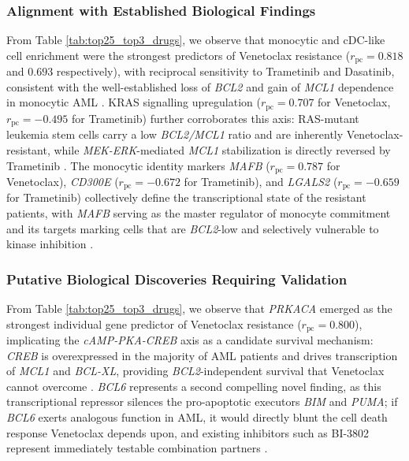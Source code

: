 \documentclass[sigconf,authordraft]{acmart}
\begin{document}
\subsubsection{Alignment with Established Biological Findings}
From Table \ref{tab:top25_top3_drugs}, we observe that monocytic and cDC-like cell enrichment were the strongest predictors of Venetoclax resistance ($r_{\text{pc}}=0.818$ and $0.693$ respectively), with reciprocal sensitivity to Trametinib and Dasatinib, consistent with the well-established loss of \textit{BCL2} and gain of \textit{MCL1} dependence in monocytic AML \cite{pei2020monocytic,lachowiez2025genetic}. KRAS signalling upregulation ($r_{\text{pc}}=0.707$ for Venetoclax, $r_{\text{pc}}=-0.495$ for Trametinib) further corroborates this axis: RAS-mutant leukemia stem cells carry a low \textit{BCL2/MCL1} ratio and are inherently Venetoclax-resistant, while \textit{MEK-ERK}-mediated \textit{MCL1} stabilization is directly reversed by Trametinib \cite{sango2024ras, desikan2022phase}. The monocytic identity markers \textit{MAFB} ($r_{\text{pc}}=0.787$ for Venetoclax), \textit{CD300E} ($r_{\text{pc}}=-0.672$ for Trametinib), and \textit{LGALS2} ($r_{\text{pc}}=-0.659$ for Trametinib) collectively define the transcriptional state of the resistant patients, with \textit{MAFB} serving as the master regulator of monocyte commitment and its targets marking cells that are \textit{BCL2}-low and selectively vulnerable to kinase inhibition \cite{pei2020monocytic,kelly2000mafb}.
\vspace{-2mm}
\subsubsection{Putative Biological Discoveries Requiring Validation}
From Table \ref{tab:top25_top3_drugs}, we observe that \textit{PRKACA} emerged as the strongest individual gene predictor of Venetoclax resistance ($r_{\text{pc}}=0.800$), implicating the \textit{cAMP-PKA-CREB} axis as a candidate survival mechanism: \textit{CREB} is overexpressed in the majority of AML patients and drives transcription of \textit{MCL1} and \textit{BCL-XL}, providing \textit{BCL2}-independent survival that Venetoclax cannot overcome \cite{shankar2005role}. \textit{BCL6} represents a second compelling novel finding, as this transcriptional repressor silences the pro-apoptotic executors \textit{BIM} and \textit{PUMA}; if \textit{BCL6} exerts analogous function in AML, it would directly blunt the cell death response Venetoclax depends upon, and existing inhibitors such as BI-3802 represent immediately testable combination partners \cite{kawabata2021bcl6}. 
\vspace{-2mm}
\end{document}
